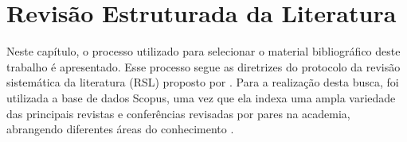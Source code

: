 \chapter{Revisão Estruturada da Literatura}   
\label{ch:revisao}

Neste capítulo, o processo utilizado para selecionar o material bibliográfico deste trabalho é apresentado. Esse processo segue as diretrizes do protocolo da revisão sistemática da literatura (RSL) proposto por . Para a realização desta busca, foi utilizada a base de dados Scopus, uma vez que ela indexa uma ampla variedade das principais revistas e conferências revisadas por pares na academia, abrangendo diferentes áreas do conhecimento \cite{elsevier2024scopus}.









%